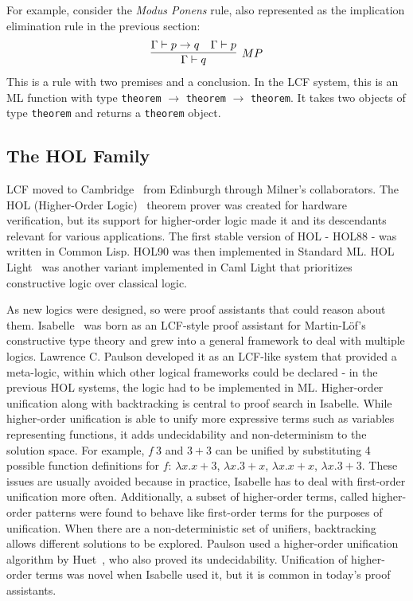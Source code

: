 \documentclass{article}
\begin{document}
	For example, consider the 
	\textit{Modus Ponens} rule, also 
	represented as the 
	implication	elimination rule in 
	the previous section:
	\begin{align*}
		\infer[MP]{\Gamma \vdash q}
		{\Gamma \vdash p \to q & \Gamma \vdash p}
	\end{align*}
	This is a rule with two premises and a 
	conclusion. In the LCF system, this is an
	ML function with type
	\texttt{theorem} $\to$ \texttt{theorem}
	$\to$ \texttt{theorem}. It takes 
	two objects of type \texttt{theorem}
	and returns a \texttt{theorem} object.
	
	\subsection{The HOL Family}
	LCF moved to 
	Cambridge~\cite{10.5555/34057} 
	from Edinburgh
	through Milner's collaborators. The 
	HOL (Higher-Order 
	Logic)~\cite{10.5555/345868.345890}
	theorem prover was created for 
	hardware verification, but its support 
	for higher-order logic made it and 
	its descendants relevant for 
	various applications. The first 
	stable version of HOL - HOL88 - was
	written in Common Lisp. HOL90 was 
	then implemented in Standard ML. HOL 
	Light~\cite{10.1007/978-3-642-03359-9_4}
	was another variant implemented in Caml 
	Light that prioritizes constructive 
	logic over classical logic. 
	
	As new logics
	were designed, so were proof 
	assistants that could reason about 
	them. 
	Isabelle~\cite{10.1007/978-3-540-71067-7_7}
	was born as an 
	LCF-style proof assistant for 
	Martin-L\"{o}f's constructive type 
	theory and grew into a general 
	framework to deal with multiple 
	logics. Lawrence C. Paulson 
	developed it as an LCF-like
	system that provided a meta-logic, 
	within which other logical frameworks 
	could be declared - in the previous 
	HOL systems, the logic had to be 
	implemented in ML. Higher-order
	unification along with backtracking
	is central to proof search in Isabelle. 
	While higher-order unification 
	is able to unify more expressive 
	terms such as variables 
	representing functions, it adds 
	undecidability and non-determinism 
	to the solution space. For example, 
	$f\ 3$ and $3+3$ can be unified 
	by substituting 4 possible function 
	definitions for $f$: 
	$\lambda x.x+3$, $\lambda x.3+x$, 
	$\lambda x.x+x$, $\lambda x.3+3$.
	These issues are usually avoided 
	because in practice, Isabelle 
	has to deal with first-order 
	unification more often. Additionally, 
	a subset of higher-order terms, 
	called higher-order patterns were 
	found to behave like first-order 
	terms for the purposes of unification.
	When there are a non-deterministic 
	set of unifiers, backtracking allows
	different solutions to be explored.
	Paulson used a higher-order 
	unification algorithm by 
	Huet~\cite{HUET197527}, who 
	also proved its undecidability. 
	Unification of higher-order terms
	was novel when Isabelle used it, 
	but it is common in today's 
	proof assistants.
	
\end{document}
